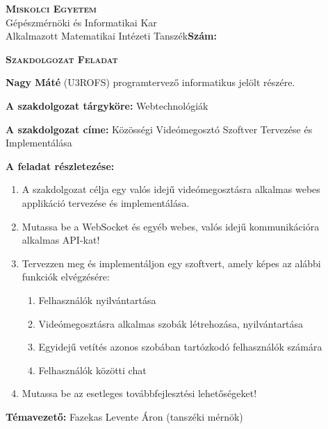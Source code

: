 \noindent
\textsc{\textbf{Miskolci Egyetem}}\\
Gépészmérnöki és Informatikai Kar\\
Alkalmazott Matematikai Intézeti Tanszék\hspace*{4cm}\hfil \textbf{Szám:}

\vspace{0.5cm}
\begin{center}
    \large\textsc{\textbf{Szakdolgozat Feladat}}
\end{center}
\vspace{0.5cm}
\textbf{Nagy Máté} (U3ROFS) programtervező informatikus jelölt részére.

\bigskip
\noindent\textbf{A szakdolgozat tárgyköre:} Webtechnológiák

\bigskip
\noindent\textbf{A szakdolgozat címe:} Közösségi Videómegosztó Szoftver Tervezése és Implementálása

\bigskip
\noindent\textbf{A feladat részletezése:}
\begin{enumerate}
    \item A szakdolgozat célja egy valós idejű videómegosztásra alkalmas webes applikáció tervezése és implementálása.
    \item Mutassa be a WebSocket és egyéb webes, valós idejű kommunikációra alkalmas API-kat!
    \item Tervezzen meg \'es implement\'aljon egy szoftvert, amely k\'epes az al\'abbi funkci\'ok elvégzésére:
          \begin{enumerate}
              \item Felhasználók nyilvántartása
              \item Videómegosztásra alkalmas szobák létrehozása, nyilvántartása
              \item Egyidejű vetítés azonos szobában tartózkodó felhasználók számára
              \item Felhasználók közötti chat
          \end{enumerate}
    \item Mutassa be az esetleges tov\'abbfejleszt\'esi lehet\H os\'egeket!
\end{enumerate}

\medskip

\vfill

\noindent\textbf{Témavezető:} Fazekas Levente \'Aron (tansz\'eki m\'ern\"ok)


